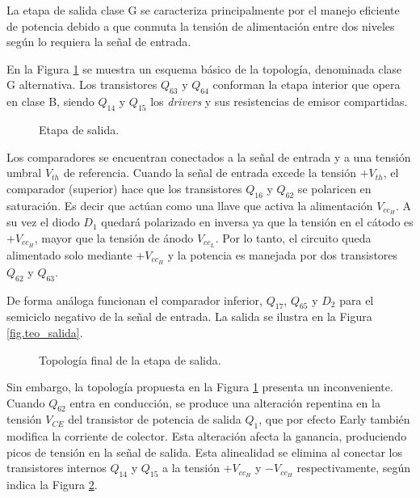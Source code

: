	La etapa de salida clase G se caracteriza principalmente por el manejo eficiente de potencia debido a que conmuta la tensión de alimentación entre dos niveles según lo requiera la señal de entrada.

	En la Figura \ref{fig.salida} se muestra un esquema básico de la topología, denominada clase G alternativa.  Los transistores $Q_{63}$ y $Q_{64}$ conforman la etapa interior que opera en clase B, siendo $Q_{14}$ y $Q_{15}$ los \textit{drivers} y sus resistencias de emisor compartidas. 

	\begin{figure}[H]
		\centering
		\scalebox{0.5}{}
		\caption{Etapa de salida.}
		\label{fig.salida}
	\end{figure}

	Los comparadores se encuentran conectados a la señal de entrada y a una tensión umbral $V_{th}$ de referencia. Cuando la señal de entrada excede la tensión $+V_{th}$, el comparador (superior) hace que los transistores $Q_{16}$ y $Q_{62}$ se polaricen en saturación. Es decir que actúan como una llave que activa la alimentación $V_{cc_H}$. A su vez el diodo $D_1$ quedará polarizado en inversa ya que la tensión en el cátodo es $+V_{cc_H}$, mayor que la tensión de ánodo $V_{cc_L}$. Por lo tanto, el circuito queda alimentado solo mediante $+V_{cc_H}$ y la potencia es manejada por dos transistores $Q_{62}$ y $Q_{63}$.

	De forma análoga funcionan el comparador inferior, $Q_{17}$, $Q_{65}$ y $D_2$ para el semiciclo negativo de la señal de entrada. La salida se ilustra en la Figura \ref{fig.teo_salida}.


	\begin{figure}[H]
		\centering
		\scalebox{0.5}{}
		\caption{Topología final de la etapa de salida.}
		\label{fig.salida_2}
	\end{figure}
	Sin embargo, la topología propuesta en la Figura \ref{fig.salida} presenta un inconveniente. Cuando $Q_{62}$ entra en conducción, se produce una alteración repentina en la tensión $V_{CE}$ del transistor de potencia de salida $Q_1$, que por efecto Early también modifica la corriente de colector. Esta alteración afecta la ganancia, produciendo picos de tensión en la señal de salida. Esta alinealidad se elimina al conectar los transistores internos $Q_{14}$ y $Q_{15}$ a la tensión $+V_{cc_H}$ y $-V_{cc_H}$ respectivamente, según indica la Figura \ref{fig.salida_2}.

